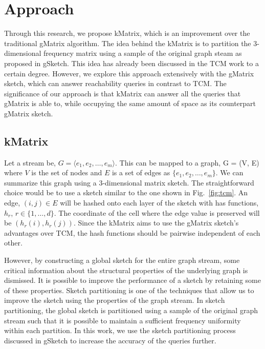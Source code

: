 \section{Approach}

Through this research, we propose kMatrix, which is an improvement over the traditional gMatrix algorithm. The idea behind the kMatrix is to partition the 3-dimensional frequency matrix using a sample of the original graph steam as proposed in gSketch\cite{zhao_gsketch:_2011}. This idea has already been discussed in the TCM work to a certain degree. However, we explore this approach extensively with the gMatrix sketch, which can answer reachability queries in contrast to TCM. The significance of our approach is that kMatrix can answer all the queries that gMatrix is able to, while occupying the same amount of space as its counterpart gMatrix sketch. 

\subsection{kMatrix}

Let a stream be, \(G = \langle e_{1}, e_{2}, \ldots, e_{m} \rangle\). This can be mapped to a graph, G = (V, E) where \(V\) is the set of nodes and \(E\) is a set of edges as \(\{e_{1}, e_{2}, \ldots, e_{m}\}\). We can summarize this graph using a 3-dimensional matrix sketch\cite{khan_query-friendly_2016}. The straightforward choice would be to use a sketch similar to the one shown in Fig.~\ref{fig:tcm}. An edge, \((i, j) \in E\) will be hashed onto each layer of the sketch with has functions, \(h_{r}\), \(r \in \{1, \ldots, d\}\). The coordinate of the cell where the edge value is preserved will be \((h_{r}(i), h_{r}(j))\). Since the kMatrix aims to use the gMatrix sketch’s advantages over TCM, the hash functions should be pairwise independent of each other. 

However, by constructing a global sketch for the entire graph stream, some critical information about the structural properties of the underlying graph is dismissed. It is possible to improve the performance of a sketch by retaining some of these properties. Sketch partitioning\cite{zhao_gsketch:_2011} is one of the techniques that allow us to improve the sketch using the properties of the graph stream. In sketch partitioning, the global sketch is partitioned using a sample of the original graph stream such that it is possible to maintain a sufficient frequency uniformity within each partition. In this work, we use the sketch partitioning process discussed in gSketch to increase the accuracy of the queries further.

